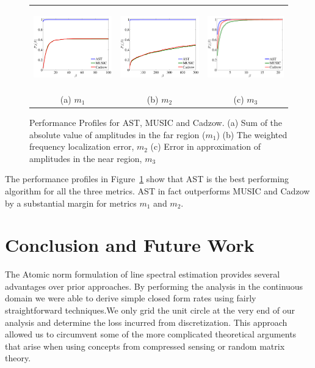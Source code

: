 \begin{figure}[htp]
\begin{tabular}{ccc}
	\includegraphics[height=35mm]{figures/m1_pp.pdf} &
	\includegraphics[height=35mm]{figures/m2_pp.pdf} &
	\includegraphics[height=35mm]{figures/m3_pp.pdf}\\
	(a) $m_1$ & (b) $m_2$ & (c) $m_3$
\end{tabular}
\caption{ Performance Profiles for AST, MUSIC and Cadzow.
(a) Sum of the absolute value of amplitudes in the far region ($m_1$)
(b) The weighted frequency localization error, $m_2$
(c) Error in approximation of amplitudes in the near region, $m_3$ }
\label{fig:pp}
\end{figure}

The performance profiles in Figure~\ref{fig:pp} show that AST is the best
performing algorithm for all the three metrics.  AST in fact outperforms
MUSIC and Cadzow by a substantial margin for metrics $m_1$ and $m_2$. 


\section{Conclusion and Future Work}\label{sec:conclusions}


The Atomic norm formulation of line spectral estimation provides several
advantages over prior approaches. By performing the
analysis in the continuous domain we were able to derive simple closed form
rates using fairly straightforward techniques.We only grid the unit circle at the very end of
our analysis and determine the loss incurred from discretization. This approach
allowed us to circumvent some of the more complicated theoretical arguments
that arise when using concepts from compressed sensing or random matrix theory.

